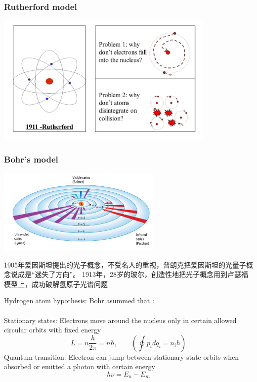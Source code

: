 \begin{frame} 
    \frametitle{Rutherford model}  
    \begin{center}
        \includegraphics[width=0.8\textwidth]{figs/utherford_atom.png}
    \end{center}  
\end{frame}

\begin{frame}   
    \frametitle{Bohr's model}  
    \begin{center}
        \includegraphics[width=0.6\textwidth]{figs/bohratom.png}
    \end{center}  
    1905年爱因斯坦提出的光子概念，不受名人的重视，普朗克把爱因斯坦的光量子概念说成是“迷失了方向”。
    1913年，28岁的玻尔，创造性地把光子概念用到卢瑟福模型上，成功破解氢原子光谱问题 
\end{frame}

\begin{frame}  
    \begin{tcolorbox1}{Hydrogen atom hypothesis:}
    Bohr asummed that :\\
    ~\\
    \bullet Stationary states: Electrons move around the nucleus only in certain allowed circular orbits with fixed energy \\
    \[ L=n \frac{h}{2\pi}= n \hbar,\qquad (\oint p_i dq_i = n_i h)\]
    \bullet Quantum transition: Electron can jump between stationary state orbits when absorbed or emitted a photon with certain energy\\
    \[ h\nu=E_n -E_m \]
    \end{tcolorbox1}
\end{frame}

